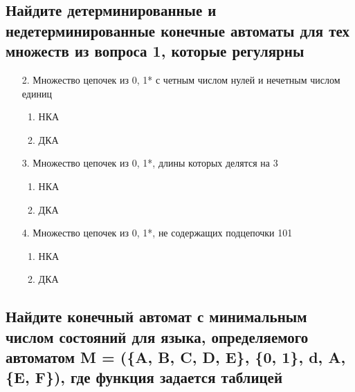 \subsection{Найдите детерминированные и недетерминированные конечные автоматы для тех множеств из вопроса 1, которые регулярны}

\begin{enumerate}
	\item[2.] Множество цепочек из {0, 1}* с четным числом нулей и нечетным числом единиц
	
	\begin{enumerate}
		\item НКА
		
		\item ДКА
		
	\end{enumerate}
	
	\item[3.] Множество цепочек из {0, 1}*, длины которых делятся на 3
	
	\begin{enumerate}
		\item НКА
		
		\item ДКА
		
	\end{enumerate}
	
	\item[4.] Множество цепочек из {0, 1}*, не содержащих подцепочки 101
	
	\begin{enumerate}
		\item НКА
		
		\item ДКА
		
	\end{enumerate}
	
\end{enumerate}

\subsection{Найдите конечный автомат с минимальным числом состояний для языка, определяемого автоматом M = (\{A, B, C, D, E\}, \{0, 1\}, d, A, \{E, F\}), где функция задается таблицей}

